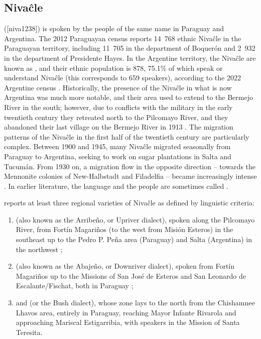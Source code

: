 \subsection{Nivaĉle} \label{intro-ni}
 ([niva1238]) is spoken by the people of the same name in Paraguay and Argentina. The 2012 Paraguayan census \citep{ine-py-12} reports 14~768 ethnic Nivaĉle in the Paraguayan territory, including 11~705 in the department of Boquerón and 2~932 in the department of Presidente Hayes. In the Argentine territory, the Nivaĉle are known as , and their ethnic population is 878, 75.1\% of which speak or understand Nivaĉle (this corresponds to 659 speakers), according to the 2022 Argentine census \citep{indec2024}. Historically, the presence of the Nivaĉle in what is now Argentina was much more notable, and their area used to extend to the Bermejo River in the south; however, due to conflicts with the military in the early twentieth century they retreated north to the Pilcomayo River, and they abandoned their last village on the Bermejo River in 1913 \citep[258]{RJH15}. The migration patterns of the Nivaĉle in the first half of the twentieth century are particularly complex. Between 1900 and 1945, many Nivaĉle migrated seasonally from Paraguay to Argentina, seeking to work on sugar plantations in Salta and Tucumán. From 1930 on, a migration flow in the opposite direction -- towards the Mennonite colonies of New-Halbstadt and Filadelfia -- became increasingly intense \citep[7--10]{NS87}. In earlier literature, the language and the people are sometimes called .

\citet[7]{AnG15} reports at least three regional varieties of Nivaĉle as defined by linguistic criteria:
\begin{enumerate}
    \item {} (also known as the Arribeño, or Upriver dialect), spoken along the Pilcomayo River, from Fortín Magariños (to the west from Misión Esteros) in the southeast up to the Pedro P. Peña area (Paraguay) and Salta (Argentina) in the northwest \citep[21--22]{NS87};
    \item {} (also known as the Abajeño, or Downriver dialect), spoken from Fortín Magariños up to the Missions of San José de Esteros and San Leonardo de Escalante/Fischat, both in Paraguay \citep[21--22]{NS87};
    \item and  (or the Bush dialect), whose zone lays to the north from the Chishamnee Lhavos area, entirely in Paraguay, reaching Mayor Infante Rivarola and approaching Mariscal Estigarribia, with speakers in the Mission of Santa Teresita.
\end{enumerate}


